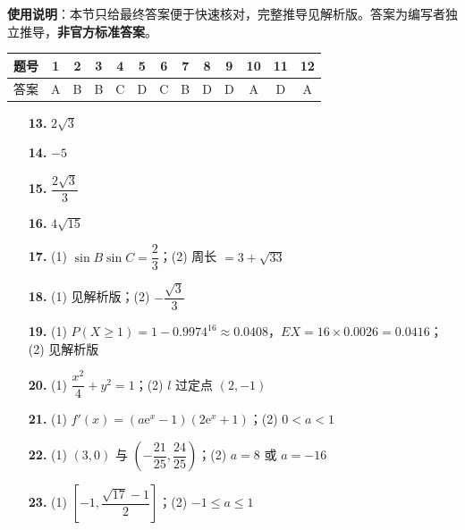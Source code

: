 
\begin{gknotice}
\textbf{使用说明}：本节只给最终答案便于快速核对，完整推导见解析版。答案为编写者独立推导，\textbf{非官方标准答案}。
\end{gknotice}

\begin{center}\begin{tabular}{ccccccccccccc}
\toprule
题号 & 1 & 2 & 3 & 4 & 5 & 6 & 7 & 8 & 9 & 10 & 11 & 12 \\
\midrule
答案 & A & B & B & C & D & C & B & D & D & A & D & A \\
\bottomrule
\end{tabular}\end{center}

\begin{itemize}[leftmargin=2.6em]
  \item[\textbf{13.}] $2\sqrt3$
  \item[\textbf{14.}] $-5$
  \item[\textbf{15.}] $\dfrac{2\sqrt3}3$
  \item[\textbf{16.}] $4\sqrt{15}$
\end{itemize}

\begin{itemize}[leftmargin=2.6em]
  \item[\textbf{17.}] (1) $\sin B\sin C=\dfrac23$；(2) 周长 $=3+\sqrt{33}$
  \item[\textbf{18.}] (1) 见解析版；(2) $-\dfrac{\sqrt3}3$
  \item[\textbf{19.}] (1) $P(X\ge1)=1-0.9974^{16}\approx0.0408$，$EX=16\times0.0026=0.0416$；(2) 见解析版
  \item[\textbf{20.}] (1) $\dfrac{x^{2}}4+y^{2}=1$；(2) $l$ 过定点 $(2,-1)$
  \item[\textbf{21.}] (1) $f'(x)=\left(a\mathrm e^{x}-1\right)\left(2\mathrm e^{x}+1\right)$；(2) $0<a<1$
\end{itemize}

\begin{itemize}[leftmargin=2.6em]
  \item[\textbf{22.}] (1) $(3,0)$ 与 $\left(-\dfrac{21}{25},\dfrac{24}{25}\right)$；(2) $a=8$ 或 $a=-16$
  \item[\textbf{23.}] (1) $\left[-1,\dfrac{\sqrt{17}-1}2\right]$；(2) $-1\le a\le1$
\end{itemize}
